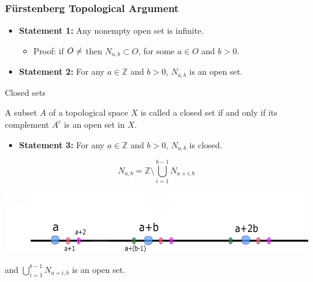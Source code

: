 \documentclass[10pt]{beamer}
\begin{document}
 \begin{frame}
   \frametitle{F\"{u}rstenberg Topological Argument}
   \begin{exampleblock}
     
   \begin{itemize}
   \item \textbf{Statement 1:} Any nonempty open set is infinite. 
     \begin{itemize}
         \item Proof: if $O \neq \empty$ then $N_{a,b} \subset O$, for some $a \in O$ and $b >0$.
       \end{itemize}
    \item \textbf{Statement 2:} For any
      $a \in \mathbb{Z}$ and $b >0$, $N_{a,b}$ is an open set. 
      \end{itemize}
    \end{exampleblock}
\pause
\begin{block}{Closed sets}

A subset $A$ of a topological space $X$ is called a closed set if and only if its complement $A^c$ is 
an open set in $X$. 
\end{block}

\begin{exampleblock}
  
  \begin{itemize}
    \item \textbf{Statement 3:}  For any
      $a \in \mathbb{Z}$ and $b >0$, $N_{a,b}$ is closed.
    \end{itemize}
    $$N_{a,b}  = \mathbb{Z} \setminus \displaystyle{\bigcup_{i=1}^{b-1}N_{a+i,b}}$$
    \vspace{-7mm}
   \begin{center}
 \includegraphics[scale=.4]{fechado.pdf}
\end{center}
\vspace{-7mm}
and $\displaystyle{\bigcup_{i=1}^{b-1}N_{a+i,b}}$ is an open set.  
\end{exampleblock}

\end{frame}
\end{document}
